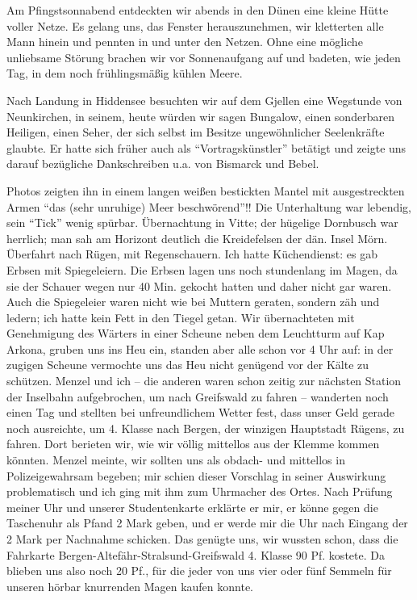 Am Pfingstsonnabend entdeckten wir abends in den Dünen eine kleine Hütte voller Netze. Es gelang uns, das Fenster herauszunehmen, wir kletterten alle Mann hinein und pennten in und unter den Netzen. Ohne eine mögliche unliebsame Störung brachen wir vor Sonnenaufgang auf und badeten, wie jeden Tag, in dem noch frühlingsmäßig kühlen Meere.

Nach Landung in Hiddensee besuchten wir auf dem Gjellen eine Wegstunde von Neunkirchen, in seinem, heute würden wir sagen Bungalow, einen sonderbaren Heiligen, einen Seher, der sich selbst im Besitze ungewöhnlicher Seelenkräfte glaubte. Er hatte sich früher auch als \enquote{Vortragskünstler} betätigt und zeigte uns darauf bezügliche Dankschreiben u.a. von Bismarck und Bebel.

Photos zeigten ihn in einem langen weißen bestickten Mantel mit ausgestreckten Armen \enquote{das (sehr unruhige) Meer beschwörend}!! Die Unterhaltung war lebendig, sein \enquote{Tick} wenig spürbar. Übernachtung in Vitte; der hügelige Dornbusch war herrlich; man sah am Horizont deutlich die Kreidefelsen der dän. Insel Mörn. Überfahrt nach Rügen, mit Regenschauern. Ich hatte Küchendienst: es gab Erbsen mit Spiegeleiern. Die Erbsen lagen uns noch stundenlang im Magen, da sie der Schauer wegen nur 40 Min. gekocht hatten und daher nicht gar waren. Auch die Spiegeleier waren nicht wie bei Muttern geraten, sondern zäh und ledern; ich hatte kein Fett in den Tiegel getan. Wir übernachteten mit Genehmigung des Wärters in einer Scheune neben dem Leuchtturm auf Kap Arkona, gruben uns ins Heu ein, standen aber alle schon vor 4 Uhr auf: in der zugigen Scheune vermochte uns das Heu nicht genügend vor der Kälte zu schützen. Menzel und ich -- die anderen waren schon zeitig zur nächsten Station der Inselbahn aufgebrochen, um nach Greifswald zu fahren -- wanderten noch einen Tag und stellten bei unfreundlichem Wetter fest, dass unser Geld gerade noch ausreichte, um 4. Klasse nach Bergen, der winzigen Hauptstadt Rügens, zu fahren. Dort berieten wir, wie wir völlig mittellos aus der Klemme kommen könnten. Menzel meinte, wir sollten uns als obdach- und mittellos in Polizeigewahrsam begeben; mir schien dieser Vorschlag in seiner Auswirkung problematisch und ich ging mit ihm zum Uhrmacher des Ortes. Nach Prüfung meiner Uhr und unserer Studentenkarte erklärte er mir, er könne gegen die Taschenuhr als Pfand 2 Mark geben, und er werde mir die Uhr nach Eingang der 2 Mark per Nachnahme schicken. Das genügte uns, wir wussten schon, dass die Fahrkarte Bergen-Altefähr-Stralsund-Greifswald 4. Klasse 90 Pf. kostete. Da blieben uns also noch 20 Pf., für die jeder von uns vier oder fünf Semmeln für unseren hörbar knurrenden Magen kaufen konnte.

